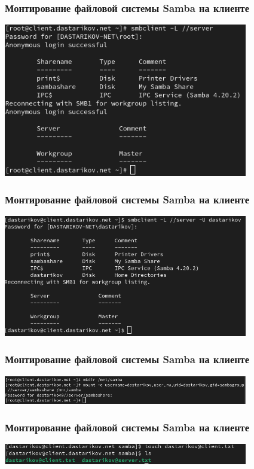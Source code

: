 \begin{frame}
\frametitle{Монтирование файловой системы Samba на клиенте}
    \includegraphics[width=0.8\textwidth]{../images/image18.png}
\end{frame}


\begin{frame}
\frametitle{Монтирование файловой системы Samba на клиенте}
    \includegraphics[width=0.8\textwidth]{../images/image19.png}
\end{frame}


\begin{frame}
\frametitle{Монтирование файловой системы Samba на клиенте}
    \includegraphics[width=0.8\textwidth]{../images/image20.png}
\end{frame}


\begin{frame}
\frametitle{Монтирование файловой системы Samba на клиенте}
    \includegraphics[width=0.8\textwidth]{../images/image21.png}
\end{frame}



